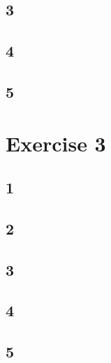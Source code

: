 \documentclass{article}
\begin{document}
    \subsection*{3}
    \subsection*{4}
    \subsection*{5}

  \section*{Exercise 3}
    \subsection*{1}
    \subsection*{2}
    \subsection*{3}
    \subsection*{4}
    \subsection*{5}
\end{document}
